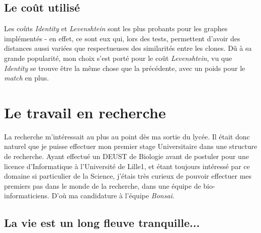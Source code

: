 \documentclass[12pt]{report}
\begin{document}
\begin{spacing}{1.2}
\section{Le coût utilisé}

Les coûts \textit{Identity} et \textit{Levenshtein} sont les plus probants pour les graphes implémentés - en effet, ce sont eux qui, lors des tests, permettent d'avoir des distances aussi variées que respectueuses des similarités entre les clones.
\newline
Dû à sa grande popularité, mon choix s'est porté pour le coût \textit{Levenshtein}, vu que \textit{Identity} se trouve être la même chose que la précédente, avec un poids pour le \textit{match} en plus.

\chapter{Le travail en recherche}

La recherche m'intéressait au plus au point dès ma sortie du lycée.
\newline
Il était donc naturel que je puisse effectuer mon premier stage Universitaire dans une structure de recherche. Ayant effectué un DEUST de Biologie avant de postuler pour une licence d'Informatique à l'Université de Lille1, et étant toujours intéressé par ce domaine si particulier de la Science, j'étais très curieux de pouvoir effectuer mes premiers pas dans le monde de la recherche, dans une équipe de bio-informaticiens. D'où ma candidature à l'équipe \textit{Bonsai}.

\section{La vie est un long fleuve tranquille...}


\end{spacing}
\end{document}
